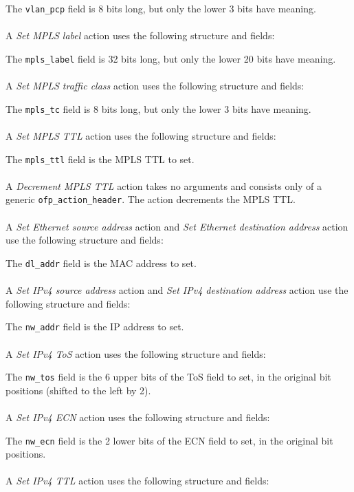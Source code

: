 
The \verb|vlan_pcp| field is 8 bits long, but only the lower 3 bits have meaning.  
\\\\
A \emph{Set MPLS label} action uses the following structure and fields:


The \verb|mpls_label| field is 32 bits long, but only the lower 20 bits have meaning.
\\\\
A \emph{Set MPLS traffic class} action uses the following structure and fields:


The \verb|mpls_tc| field is 8 bits long, but only the lower 3 bits have meaning.
\\\\
A \emph{Set MPLS TTL} action uses the following structure and fields:


The \verb|mpls_ttl| field is the MPLS TTL to set.
\\\\
A \emph{Decrement MPLS TTL} action takes no arguments and consists only of a generic \verb|ofp_action_header|. The action decrements the MPLS TTL.
\\\\
A \emph{Set Ethernet source address} action and \emph{Set Ethernet destination address} action use the following structure and fields:


The \verb|dl_addr| field is the MAC address to set.
\\\\
A \emph{Set IPv4 source address} action and \emph{Set IPv4 destination address} action use the following structure and fields:


The \verb|nw_addr| field is the IP address to set.
\\\\
A \emph{Set IPv4 ToS} action uses the following structure and fields:


The \verb|nw_tos| field is the 6 upper bits of the ToS field to set, in the original bit positions (shifted to the left by 2).
\\\\
A \emph{Set IPv4 ECN} action uses the following structure and fields:


The \verb|nw_ecn| field is the 2 lower bits of the ECN field to set, in the original bit positions.
\\\\
A \emph{Set IPv4 TTL} action uses the following structure and fields:

